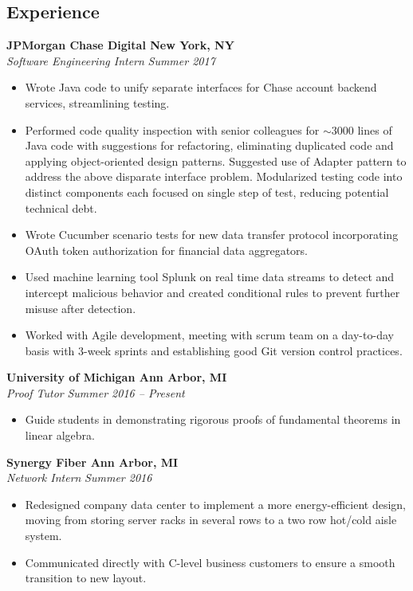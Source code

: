 \documentclass[margin,line]{resume}
\begin{document}
\begin{resume}
	\section{\mysidestyle Experience}
	    
	\textbf{JPMorgan Chase Digital \hfill New York, NY} \\\vspace{1mm}%
	\textsl{Software Engineering Intern} \hfill \textsl{Summer 2017}
	\begin{itemize}[leftmargin=4mm]
		\item Wrote Java code to unify separate interfaces for Chase account backend services, streamlining testing.
		\item Performed code quality inspection with senior colleagues for $\sim3000$ lines of Java code with suggestions for refactoring, eliminating duplicated code and applying object-oriented design patterns. Suggested  use of Adapter pattern to address the above disparate interface problem. Modularized testing code into distinct components each focused on single step of test, reducing potential technical debt.
		\item Wrote Cucumber scenario tests for new data transfer protocol incorporating OAuth token authorization for financial data aggregators.
		\item Used machine learning tool Splunk on real time data streams to detect and intercept malicious behavior and created conditional rules to prevent further misuse after detection. 
		\item Worked with Agile development, meeting with scrum team on a day-to-day basis with $3$-week sprints and establishing good Git version control practices.
	\end{itemize}
	
	\vspace{-1.5mm}
	\textbf{University of Michigan \hfill Ann Arbor, MI} \\\vspace{1mm}%
	\textsl{Proof Tutor} \hfill \textsl{Summer 2016 -- Present}
	\begin{itemize}[leftmargin=4mm]
		\item Guide students in demonstrating rigorous proofs of fundamental theorems in linear algebra.
	\end{itemize}
	
	\vspace{-1.5mm}
	\textbf{Synergy Fiber \hfill Ann Arbor, MI} \\\vspace{1mm}%
	\textsl{Network Intern} \hfill \textsl{Summer 2016}
	\begin{itemize}[leftmargin=4mm]
		\item Redesigned company data center to implement a more energy-efficient design, moving from storing server racks in several rows to a two row hot/cold aisle system.
		\item Communicated directly with C-level business customers to ensure a smooth transition to new layout. 
	\end{itemize}
	\vspace{1.5mm}
	

\end{resume}
\end{document}
